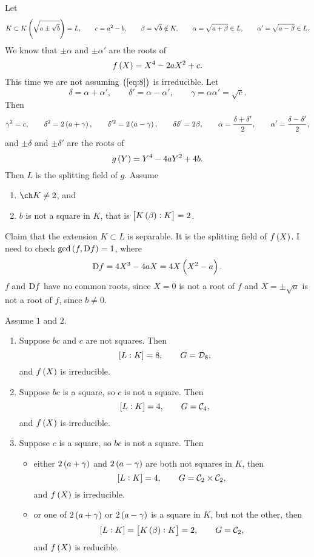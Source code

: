 Let
$$ K \subset K\br{\sqrt{a \pm \sqrt{b}}} = L, \qquad c = a^2 - b, \qquad \beta = \sqrt{b} \notin K, \qquad \alpha = \sqrt{a + \beta} \in L, \qquad \alpha' = \sqrt{a - \beta} \in L. $$
We know that $ \pm\alpha $ and $ \pm\alpha' $ are the roots of
\begin{equation}
\label{eq:8}
f\br{X} = X^4 - 2aX^2 + c.
\end{equation}
This time we are not assuming $ \br{\ref{eq:8}} $ is irreducible. Let
$$ \delta = \alpha + \alpha', \qquad \delta' = \alpha - \alpha', \qquad \gamma = \alpha\alpha' = \sqrt{c}. $$
Then
$$ \gamma^2 = c, \qquad \delta^2 = 2\br{a + \gamma}, \qquad \delta'^2 = 2\br{a - \gamma}, \qquad \delta\delta' = 2\beta, \qquad \alpha = \dfrac{\delta + \delta'}{2}, \qquad \alpha' = \dfrac{\delta - \delta'}{2}, $$
and $ \pm\delta $ and $ \pm\delta' $ are the roots of
$$ g\br{Y} = Y^4 - 4aY^2 + 4b. $$
Then $ L $ is the splitting field of $ g $. Assume
\begin{enumerate}
\item $ \ch K \ne 2 $, and
\item $ b $ is not a square in $ K $, that is $ \sbr{K\br{\beta} : K} = 2 $.
\end{enumerate}
Claim that the extension $ K \subset L $ is separable. It is the splitting field of $ f\br{X} $. I need to check $ \gcd\br{f, \D f} = 1 $, where
$$ \D f = 4X^3 - 4aX = 4X\br{X^2 - a}. $$
$ f $ and $ \mathrm{D} f $ have no common roots, since $ X = 0 $ is not a root of $ f $ and $ X = \pm\sqrt{a} $ is not a root of $ f $, since $ b \ne 0 $.

\begin{theorem}
\label{thm:biquadratic}
Assume $ 1 $ and $ 2 $.
\begin{enumerate}
\item Suppose $ bc $ and $ c $ are not squares. Then
$$ \sbr{L : K} = 8, \qquad G = \DDD_8, $$
and $ f\br{X} $ is irreducible.
\item Suppose $ bc $ is a square, so $ c $ is not a square. Then
$$ \sbr{L : K} = 4, \qquad G = \CCC_4, $$
and $ f\br{X} $ is irreducible.
\item Suppose $ c $ is a square, so $ bc $ is not a square. Then
\begin{itemize}
\item either $ 2\br{a + \gamma} $ and $ 2\br{a - \gamma} $ are both not squares in $ K $, then
$$ \sbr{L : K} = 4, \qquad G = \CCC_2 \times \CCC_2, $$
and $ f\br{X} $ is irreducible.
\item or one of $ 2\br{a + \gamma} $ or $ 2\br{a - \gamma} $ is a square in $ K $, but not the other, then
$$ \sbr{L : K} = \sbr{K\br{\beta} : K} = 2, \qquad G = \CCC_2, $$
and $ f\br{X} $ is reducible.
\end{itemize}
\end{enumerate}
\end{theorem}

